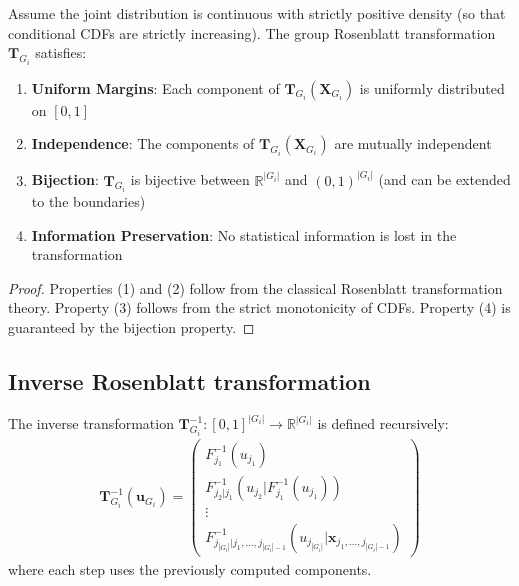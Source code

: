 \begin{theorem}
\label{thm:rosenblatt_properties}
Assume the joint distribution is continuous with strictly positive density (so that conditional CDFs are strictly increasing). The group Rosenblatt transformation $\mathbf{T}_{G_i}$ satisfies:
\begin{enumerate}
    \item \textbf{Uniform Margins}: Each component of $\mathbf{T}_{G_i}(\mathbf{X}_{G_i})$ is uniformly distributed on $[0,1]$
    \item \textbf{Independence}: The components of $\mathbf{T}_{G_i}(\mathbf{X}_{G_i})$ are mutually independent
    \item \textbf{Bijection}: $\mathbf{T}_{G_i}$ is bijective between $\mathbb{R}^{|G_i|}$ and $(0,1)^{|G_i|}$ (and can be extended to the boundaries)
    \item \textbf{Information Preservation}: No statistical information is lost in the transformation
\end{enumerate}
\end{theorem}
\begin{proof}
Properties (1) and (2) follow from the classical Rosenblatt transformation theory. Property (3) follows from the strict monotonicity of CDFs. Property (4) is guaranteed by the bijection property.
\end{proof}

\subsection{Inverse Rosenblatt transformation}
\begin{definition}
The inverse transformation $\mathbf{T}_{G_i}^{-1}: [0,1]^{|G_i|} \to \mathbb{R}^{|G_i|}$ is defined recursively:
\begin{align}
\mathbf{T}_{G_i}^{-1}(\mathbf{u}_{G_i}) = \begin{pmatrix}
F_{j_1}^{-1}(u_{j_1}) \\
F_{j_2|j_1}^{-1}(u_{j_2}|F_{j_1}^{-1}(u_{j_1})) \\
\vdots \\
F_{j_{|G_i|}|j_1,\ldots,j_{|G_i|-1}}^{-1}(u_{j_{|G_i|}}|\mathbf{x}_{j_1,\ldots,j_{|G_i|-1}})
\end{pmatrix}
\end{align}
where each step uses the previously computed components.
\end{definition}

